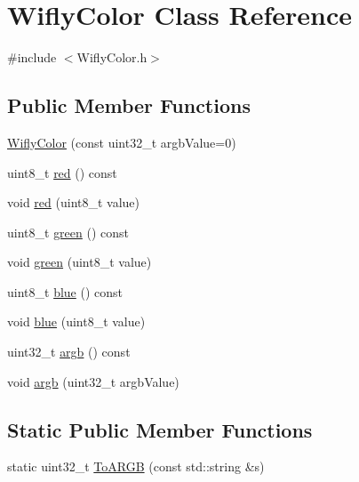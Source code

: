 \hypertarget{class_wifly_color}{\section{Wifly\-Color Class Reference}
\label{class_wifly_color}
}


{\ttfamily \#include $<$Wifly\-Color.\-h$>$}

\subsection*{Public Member Functions}
\begin{DoxyCompactItemize}
\item 
\hyperlink{class_wifly_color_a68d2fd89ce0c7d55514587c39f97e01c}{Wifly\-Color} (const uint32\-\_\-t argb\-Value=0)
\item 
uint8\-\_\-t \hyperlink{class_wifly_color_ad8523a03d716f35671c4e74f8940eb37}{red} () const 
\item 
void \hyperlink{class_wifly_color_a9397eca76be8f7abb88a84b719d99d6b}{red} (uint8\-\_\-t value)
\item 
uint8\-\_\-t \hyperlink{class_wifly_color_aeba066005ba425225621111ea6b9251f}{green} () const 
\item 
void \hyperlink{class_wifly_color_abe50acffd7b1a172597ae8525149763a}{green} (uint8\-\_\-t value)
\item 
uint8\-\_\-t \hyperlink{class_wifly_color_a9b2e0b29756d5915f4e96b85c1978fea}{blue} () const 
\item 
void \hyperlink{class_wifly_color_ad0c7f227f49eb00af032f4ae95e78f4a}{blue} (uint8\-\_\-t value)
\item 
uint32\-\_\-t \hyperlink{class_wifly_color_ac4034056a383f4e8c8beae0586459b8d}{argb} () const 
\item 
void \hyperlink{class_wifly_color_acfccad3c8a67c2e2f417beca040bc8df}{argb} (uint32\-\_\-t argb\-Value)
\end{DoxyCompactItemize}
\subsection*{Static Public Member Functions}
\begin{DoxyCompactItemize}
\item 
static uint32\-\_\-t \hyperlink{class_wifly_color_a0e552c6a422e953415700714ab9db184}{To\-A\-R\-G\-B} (const std\-::string \&s)
\end{DoxyCompactItemize}
